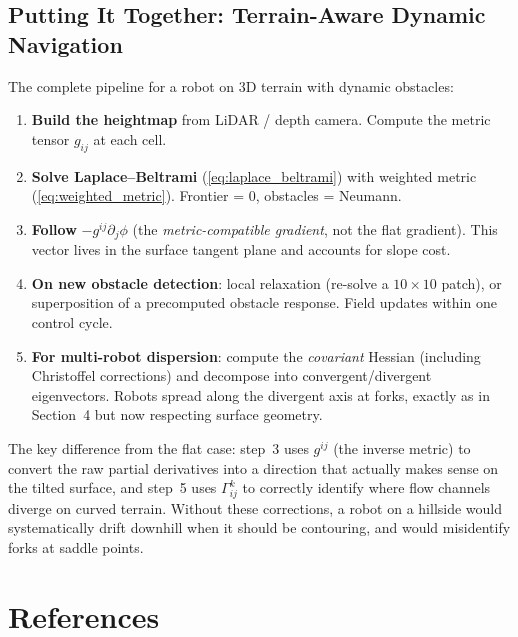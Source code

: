 \documentclass[11pt]{article}
\begin{document}
\subsection{Putting It Together: Terrain-Aware Dynamic Navigation}

The complete pipeline for a robot on 3D terrain with dynamic
obstacles:

\begin{enumerate}
    \item \textbf{Build the heightmap} from LiDAR / depth camera.
    Compute the metric tensor $g_{ij}$ at each cell.
    \item \textbf{Solve Laplace--Beltrami} (\ref{eq:laplace_beltrami})
    with weighted metric (\ref{eq:weighted_metric}).
    Frontier = 0, obstacles = Neumann.
    \item \textbf{Follow} $-g^{ij}\partial_j\phi$ (the
    \emph{metric-compatible gradient}, not the flat gradient).
    This vector lives in the surface tangent plane and
    accounts for slope cost.
    \item \textbf{On new obstacle detection}: local relaxation
    (re-solve a $10 \times 10$ patch), or superposition of a
    precomputed obstacle response.  Field updates within one
    control cycle.
    \item \textbf{For multi-robot dispersion}: compute the
    \emph{covariant} Hessian (including Christoffel corrections)
    and decompose into convergent/divergent eigenvectors.  Robots
    spread along the divergent axis at forks, exactly as in
    Section~4 but now respecting surface geometry.
\end{enumerate}

The key difference from the flat case: step~3 uses $g^{ij}$ (the
inverse metric) to convert the raw partial derivatives into a
direction that actually makes sense on the tilted surface, and
step~5 uses $\Gamma^k_{ij}$ to correctly identify where flow
channels diverge on curved terrain.  Without these corrections, a
robot on a hillside would systematically drift downhill when it
should be contouring, and would misidentify forks at saddle points.

\section*{References}
\end{document}
